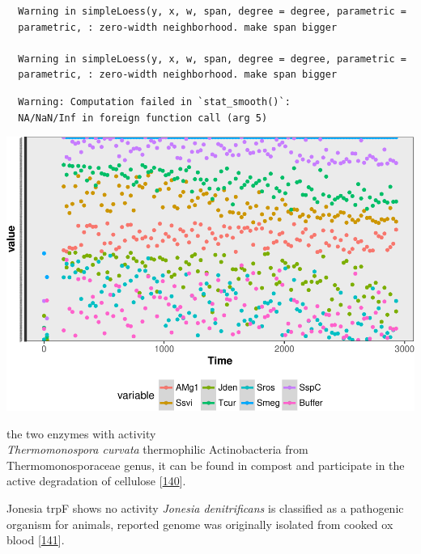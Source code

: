 \documentclass[12pt,twoside]{reedthesis}
\begin{document}
  \begin{verbatim}
  Warning in simpleLoess(y, x, w, span, degree = degree, parametric =
  parametric, : zero-width neighborhood. make span bigger
  
  Warning in simpleLoess(y, x, w, span, degree = degree, parametric =
  parametric, : zero-width neighborhood. make span bigger
  \end{verbatim}
  
  \begin{verbatim}
  Warning: Computation failed in `stat_smooth()`:
  NA/NaN/Inf in foreign function call (arg 5)
  \end{verbatim}
  
  \begin{center}\includegraphics{tesis_files/figure-latex/activity-4} \end{center}
  
  the two enzymes with activity\\
  \emph{Thermomonospora curvata} thermophilic Actinobacteria from
  Thermomonosporaceae genus, it can be found in compost and participate in
  the active degradation of cellulose
  {[}\protect\hyperlink{ref-chertkovux5fcompleteux5f2011}{140}{]}.
  
  Jonesia trpF shows no activity \emph{Jonesia denitrificans} is
  classified as a pathogenic organism for animals, reported genome was
  originally isolated from cooked ox blood
  {[}\protect\hyperlink{ref-pukallux5fcompleteux5f2009}{141}{]}.
  
  \begin{Shaded}
  \begin{Highlighting}[]
  \StringTok{ }\NormalTok{(}\NormalTok{, }\NormalTok{, }\NormalTok{)}
   \CharTok{\textbackslash{}\textbackslash{}}\NormalTok{,} \NormalTok{)}
  \end{Highlighting}
  \end{Shaded}
  
\end{document}
